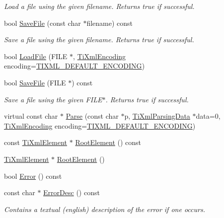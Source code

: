 \begin{DoxyCompactItemize}
\begin{DoxyCompactList}\small\item\em Load a file using the given filename. Returns true if successful. \item\end{DoxyCompactList}\item 
bool \hyperlink{class_ti_xml_document_ae869f5ebf7fc54c4a1d737fb4689fd44}{SaveFile} (const char $\ast$filename) const 
\begin{DoxyCompactList}\small\item\em Save a file using the given filename. Returns true if successful. \item\end{DoxyCompactList}\item 
bool \hyperlink{class_ti_xml_document_a41f6fe7200864d1dca663d230caf8db6}{LoadFile} (FILE $\ast$, \hyperlink{tinyxml_8h_a88d51847a13ee0f4b4d320d03d2c4d96}{TiXmlEncoding} encoding=\hyperlink{tinyxml_8h_ad5b8b092878e9010d6400cb6c13d4879}{TIXML\_\-DEFAULT\_\-ENCODING})
\item 
bool \hyperlink{class_ti_xml_document_acf1672b4538c6d1d441f9f108aea2bf4}{SaveFile} (FILE $\ast$) const 
\begin{DoxyCompactList}\small\item\em Save a file using the given FILE$\ast$. Returns true if successful. \item\end{DoxyCompactList}\item 
virtual const char $\ast$ \hyperlink{class_ti_xml_document_a789ad2f06f93d52bdb5570b2f3670289}{Parse} (const char $\ast$p, \hyperlink{class_ti_xml_parsing_data}{TiXmlParsingData} $\ast$data=0, \hyperlink{tinyxml_8h_a88d51847a13ee0f4b4d320d03d2c4d96}{TiXmlEncoding} encoding=\hyperlink{tinyxml_8h_ad5b8b092878e9010d6400cb6c13d4879}{TIXML\_\-DEFAULT\_\-ENCODING})
\item 
const \hyperlink{class_ti_xml_element}{TiXmlElement} $\ast$ \hyperlink{class_ti_xml_document_ad09d17927f908f40efb406af2fb873be}{RootElement} () const 
\item 
\hyperlink{class_ti_xml_element}{TiXmlElement} $\ast$ \hyperlink{class_ti_xml_document_a0b43e762a23f938b06651bc90b8a1013}{RootElement} ()
\item 
bool \hyperlink{class_ti_xml_document_a6dfc01a6e5d58e56acd537dfd3bdeb29}{Error} () const 
\item 
const char $\ast$ \hyperlink{class_ti_xml_document_a9d0f689f6e09ea494ea547be8d79c25e}{ErrorDesc} () const 
\begin{DoxyCompactList}\small\item\em Contains a textual (english) description of the error if one occurs. \item\end{DoxyCompactList}\item 

\end{DoxyCompactItemize}
